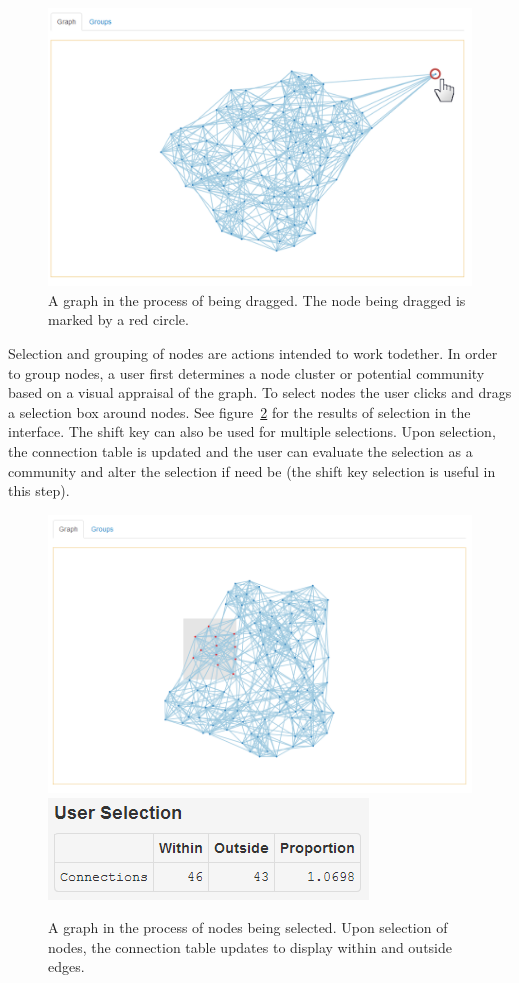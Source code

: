 \documentclass{article}\usepackage[]{graphicx}\usepackage[]{color}
\begin{document}
\begin{figure}[H]
\centering
\includegraphics[width=\textwidth]{images/graphdrag.png}
\caption{\label{fig:graphdrag} A graph in the process of being dragged. The node being dragged is marked by a red circle.}
\end{figure}

Selection and grouping of nodes are actions intended to work todether. In order to group nodes, a user first determines a node cluster or potential community based on a visual appraisal of the graph. To select nodes the user clicks and drags a selection box around nodes. See figure~\ref{fig:graphselect} for the results of selection in the interface. The shift key can also be used for multiple selections. Upon selection, the connection table is updated and the user can evaluate the selection as a community and alter the selection if need be (the shift key selection is useful in this step).

\begin{figure}[H]
\centering
\includegraphics[width=\textwidth]{images/graphselect.png}
\includegraphics[]{images/tableselect.png}
\caption{\label{fig:graphselect} A graph in the process of nodes being selected. Upon selection of nodes, the connection table updates to display within and outside edges.}
\end{figure}
\end{document}
